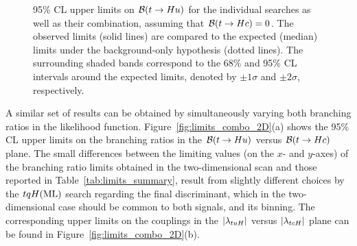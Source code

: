 \begin{figure}[h!]
\begin{center}
\caption{\small {95\% CL upper limits on $\mathcal{B}(t\to Hu)$ for the individual searches as well as their
combination, assuming that $\mathcal{B}(t\to Hc)=0$. The observed limits (solid lines) are compared to the 
expected (median) limits under the background-only
hypothesis (dotted lines). The surrounding shaded bands correspond to the 68\% and 95\% CL intervals around the expected limits, 
denoted by $\pm 1\sigma$ and $\pm 2\sigma$, respectively.
}}
\label{fig:limits_combo_1D_hu} 
\end{center}
\end{figure}

A similar set of results can be obtained by simultaneously varying both branching ratios in the likelihood function.
Figure~\ref{fig:limits_combo_2D}(a) shows the 95\% CL upper limits on the branching ratios in the $\mathcal{B}(t\to Hu)$ versus $\mathcal{B}(t\to Hc)$ plane. 
The small differences between the limiting values (on the $x$- and $y$-axes) of the branching ratio limits obtained in the two-dimensional scan and 
those reported in Table~\ref{tab:limits_summary}, result from slightly different choices by the $tqH(\mathrm{ML})$ search  
regarding the final discriminant, which in the two-dimensional case should be common to both signals, and its binning.
The corresponding upper limits on the couplings in the $|\lambda_{tuH}|$ versus $|\lambda_{tcH}|$ plane can be found in Figure~\ref{fig:limits_combo_2D}(b).

